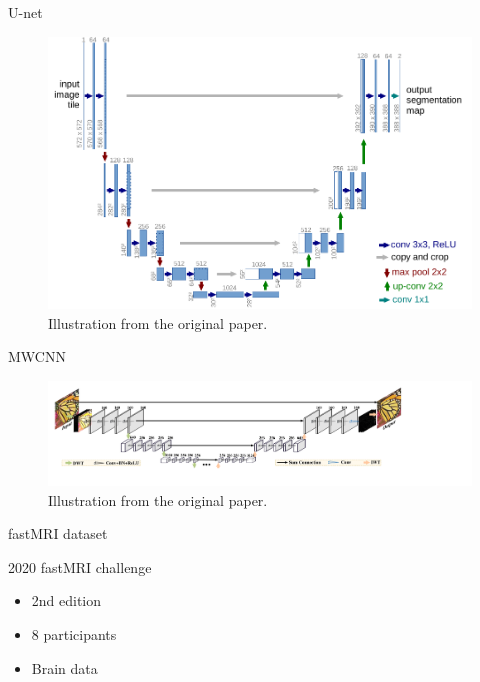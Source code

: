 \begin{frame}{U-net}
    \begin{figure}
        \centering
        \includegraphics[height=0.6\textheight]{Figures/add_slides/unet_hires.pdf}
        \caption{Illustration from the original paper.}
    \end{figure}
\end{frame}

\begin{frame}{MWCNN}
    \begin{figure}
        \centering
        \includegraphics[width=\textwidth]{Figures/add_slides/mwcnn.pdf}
        \caption{Illustration from the original paper.}
    \end{figure}
\end{frame}

\begin{frame}{fastMRI dataset}

\end{frame}

\begin{frame}{2020 fastMRI challenge}
    \begin{itemize}
        \item 2nd edition
        \item 8 participants
        \item Brain data
    \end{itemize}
\end{frame}

